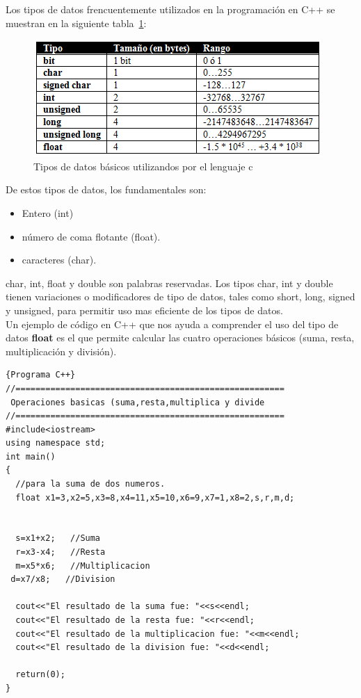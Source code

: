 \documentclass[a4paper,12pt,spanish]{article}
\begin{document}
Los tipos de datos frencuentemente utilizados en la programación en C++ se muestran en la siguiente tabla~\ref{fig:tiposdatosc}: 

\begin{figure}[H]
  \centering
  \includegraphics[scale=0.9]{TiposDatosC}
  \caption{Tipos de datos básicos utilizandos por el lenguaje c}
  \label{fig:tiposdatosc}
\end{figure}

De estos tipos de datos, los fundamentales son:
\begin{itemize}
\item Entero (int)
\item número de coma flotante (float).
\item caracteres (char).
\end{itemize}

char, int, float y double son palabras reservadas. Los tipos char, int y double tienen variaciones o modificadores de tipo de datos, tales como short, long, signed y unsigned, para permitir uso mas eficiente de los tipos de datos. \\

Un ejemplo de código en C++ que nos ayuda a comprender el uso del tipo de datos \textbf{float} es el que permite calcular las cuatro operaciones básicos (suma, resta, multiplicación y división).

\begin{lstlisting}[frame=trBL,firstnumber=1,caption={\textbf{OperBasi1.cpp}: Operaciones Básicas}]{Programa C++}
//======================================================
 Operaciones basicas (suma,resta,multiplica y divide
//======================================================
#include<iostream>
using namespace std;
int main()
{
  //para la suma de dos numeros.
  float x1=3,x2=5,x3=8,x4=11,x5=10,x6=9,x7=1,x8=2,s,r,m,d;


  s=x1+x2;   //Suma
  r=x3-x4;   //Resta
  m=x5*x6;   //Multiplicacion
 d=x7/x8;   //Division

  cout<<"El resultado de la suma fue: "<<s<<endl;
  cout<<"El resultado de la resta fue: "<<r<<endl;
  cout<<"El resultado de la multiplicacion fue: "<<m<<endl;
  cout<<"El resultado de la division fue: "<<d<<endl;

  return(0);
}
  
\end{lstlisting}
\end{document}
